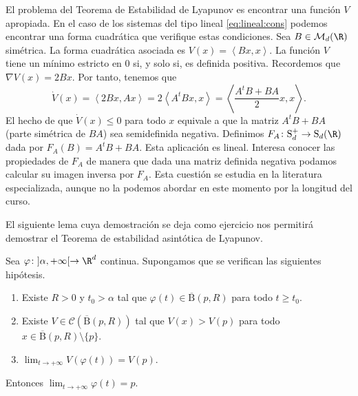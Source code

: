 El problema del Teorema de Estabilidad de Lyapunov es encontrar una función $V$ apropiada. En el
caso de los sistemas del tipo lineal \eqref{eq:lineal:cons} podemos encontrar una forma cuadrática
que verifique estas condiciones. Sea $B \in \mathcal{M}_d(\R)$ simétrica. La forma cuadrática
asociada es $V(x) = \left\langle Bx, x \right\rangle$. La función $V$ tiene un mínimo estricto en
$0$ si, y solo si, es definida positiva. Recordemos que $\nabla V(x) = 2 Bx$. Por tanto, tenemos que
\[\dot{V}(x) = \left\langle 2 B x, Ax \right\rangle = 2 \left\langle A^{t} Bx, x \right\rangle =
  \left\langle \frac{A^{t}B + B A}{2} x, x\right\rangle.\] El hecho de que $\dot{V}(x) \le 0$ para
todo $x$ equivale a que la matriz $A^{t}B + B A$ (parte simétrica de $BA$) sea semidefinida
negativa. Definimos $F_A \colon \mathrm{S}^+_d \to \mathrm{S}_d(\R)$ dada por $F_A(B) =
A^{t}B+BA$. Esta aplicación es lineal. Interesa conocer las propiedades de $F_A$ de manera que dada
una matriz definida negativa podamos calcular su imagen inversa por $F_A$. Esta cuestión se estudia
en la literatura especializada, aunque no la podemos abordar en este momento por la longitud del
curso.

El siguiente lema cuya demostración se deja como ejercicio nos permitirá demostrar el Teorema de
estabilidad asintótica de Lyapunov.
\begin{lemma}
  Sea $\varphi \colon ]\alpha, +\infty[ \to \R^d$ continua. Supongamos que se verifican las
  siguientes hipótesis.
  \begin{enumerate}
  \item Existe $R > 0$ y $t_0 > \alpha$ tal que $\varphi(t) \in \overline{\mathrm{B}}(p,R)$ para
    todo $t \ge t_0$.
  \item Existe $V \in \mathcal{C}(\overline{\mathrm{B}}(p,R))$ tal que $V(x) > V(p)$ para todo
    $x \in \overline{\mathrm{B}}(p,R)\setminus \{p\}$.
  \item $\lim_{t \to +\infty} V(\varphi(t)) = V(p)$.
  \end{enumerate}
  Entonces $\lim_{t \to +\infty} \varphi(t) = p$.
\end{lemma}

